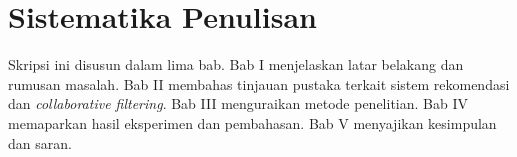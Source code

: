 \section{Sistematika Penulisan}
Skripsi ini disusun dalam lima bab. Bab I menjelaskan latar belakang dan
rumusan masalah. Bab II membahas tinjauan pustaka terkait sistem
rekomendasi dan \emph{collaborative filtering}. Bab III menguraikan metode
penelitian. Bab IV memaparkan hasil eksperimen dan pembahasan. Bab V
menyajikan kesimpulan dan saran.

